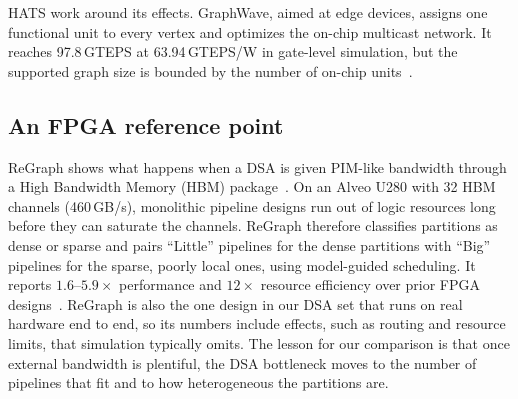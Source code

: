 \documentclass[journal,onecolumn]{IEEEtran}
\begin{document}
HATS work around its effects. GraphWave, aimed at edge devices, assigns one functional unit to every vertex and optimizes the on-chip multicast network. It reaches 97.8\,GTEPS at 63.94\,GTEPS/W in gate-level simulation, but the supported graph size is bounded by the number of on-chip units~\cite{lee2022graphwave}.

\subsection{An FPGA reference point}
ReGraph shows what happens when a DSA is given PIM-like bandwidth through a High Bandwidth Memory (HBM) package~\cite{chen2022regraph}. On an Alveo U280 with 32 HBM channels (460\,GB/s), monolithic pipeline designs run out of logic resources long before they can saturate the channels. ReGraph therefore classifies partitions as dense or sparse and pairs ``Little'' pipelines for the dense partitions with ``Big'' pipelines for the sparse, poorly local ones, using model-guided scheduling. It reports $1.6$--$5.9\times$ performance and $12\times$ resource efficiency over prior FPGA designs~\cite{chen2022regraph}. ReGraph is also the one design in our DSA set that runs on real hardware end to end, so its numbers include effects, such as routing and resource limits, that simulation typically omits. The lesson for our comparison is that once external bandwidth is plentiful, the DSA bottleneck moves to the number of pipelines that fit and to how heterogeneous the partitions are.
\end{document}
